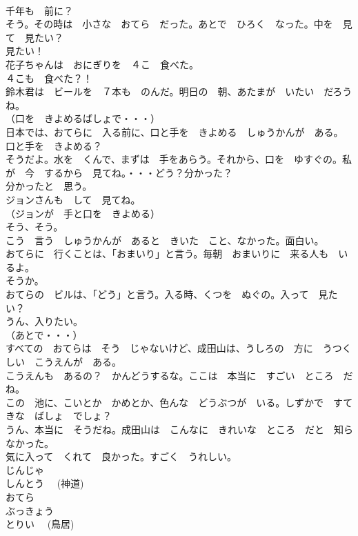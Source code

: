 \documentclass[8pt]{extreport}
\begin{document}
\begin{CJK}{UTF8}{min}
\\	千年も　前に？	
\\	そう。その時は　小さな　おてら　だった。あとで　ひろく　なった。中を　見て　見たい？	
\\	見たい！	
\\	花子ちゃんは　おにぎりを　４こ　食べた。	
\\	４こも　食べた？！	
\\	鈴木君は　ビールを　７本も　のんだ。明日の　朝、あたまが　いたい　だろうね。	
\\	（口を　きよめるばしょで・・・）	
\\	日本では、おてらに　入る前に、口と手を　きよめる　しゅうかんが　ある。	
\\	口と手を　きよめる？	
\\	そうだよ。水を　くんで、まずは　手をあらう。それから、口を　ゆすぐの。私が　今　するから　見てね。・・・どう？分かった？	
\\	分かったと　思う。	
\\	ジョンさんも　して　見てね。	
\\	（ジョンが　手と口を　きよめる）	
\\	そう、そう。	
\\	こう　言う　しゅうかんが　あると　きいた　こと、なかった。面白い。	
\\	おてらに　行くことは、「おまいり」と言う。毎朝　おまいりに　来る人も　いるよ。	
\\	そうか。	
\\	おてらの　ビルは、「どう」と言う。入る時、くつを　ぬぐの。入って　見たい？	
\\	うん、入りたい。	
\\	（あとで・・・）	
\\	すべての　おてらは　そう　じゃないけど、成田山は、うしろの　方に　うつくしい　こうえんが　ある。	
\\	こうえんも　あるの？　かんどうするな。ここは　本当に　すごい　ところ　だね。	
\\	この　池に、こいとか　かめとか、色んな　どうぶつが　いる。しずかで　すてきな　ばしょ　でしょ？	
\\	うん、本当に　そうだね。成田山は　こんなに　きれいな　ところ　だと　知らなかった。	
\\	気に入って　くれて　良かった。すごく　うれしい。	
\\	じんじゃ	
\\	しんとう　 (神道)	
\\	おてら	
\\	ぶっきょう	
\\	とりい　 (鳥居)	

\end{CJK}
\end{document}
